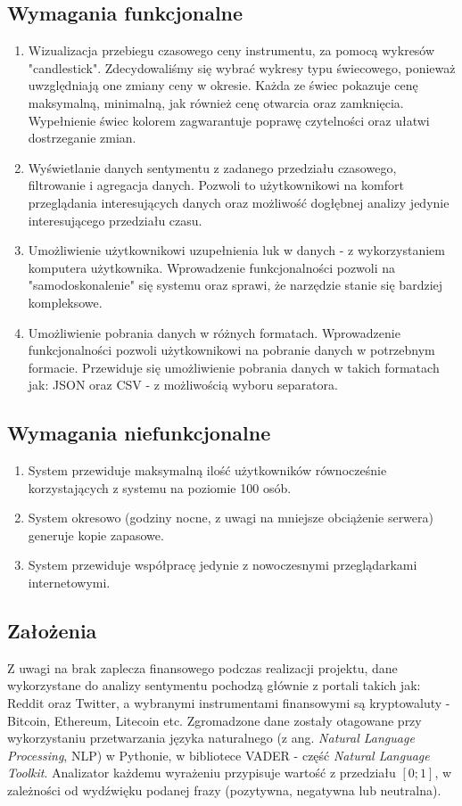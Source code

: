 \subsection{Wymagania funkcjonalne}
\begin{enumerate}
  \item {Wizualizacja przebiegu czasowego ceny instrumentu, za pomocą wykresów "candlestick". Zdecydowaliśmy się wybrać wykresy typu świecowego, ponieważ uwzględniają one zmiany ceny w okresie. Każda ze świec pokazuje cenę maksymalną, minimalną, jak również cenę otwarcia oraz zamknięcia. Wypełnienie świec kolorem zagwarantuje poprawę czytelności oraz ułatwi dostrzeganie zmian.}
  \item {Wyświetlanie danych sentymentu z zadanego przedziału czasowego, filtrowanie i agregacja danych. Pozwoli to użytkownikowi na komfort przeglądania interesujących danych oraz możliwość dogłębnej analizy jedynie interesującego przedziału czasu.}
  \item {Umożliwienie użytkownikowi uzupełnienia luk w danych - z wykorzystaniem komputera użytkownika. Wprowadzenie funkcjonalności pozwoli na "samodoskonalenie" się systemu oraz sprawi, że narzędzie stanie się bardziej kompleksowe.}
  \item {Umożliwienie pobrania danych w różnych formatach. Wprowadzenie funkcjonalności pozwoli użytkownikowi na pobranie danych w potrzebnym formacie. Przewiduje się umożliwienie pobrania danych w takich formatach jak: JSON oraz CSV - z możliwością wyboru separatora.}
\end{enumerate}
  \clearpage
\subsection{Wymagania niefunkcjonalne}
\begin{enumerate}
  \item {System przewiduje maksymalną ilość użytkowników równocześnie korzystających z systemu na poziomie 100 osób.}
  \item {System okresowo (godziny nocne, z uwagi na mniejsze obciążenie serwera) generuje kopie zapasowe.}
  \item {System przewiduje współpracę jedynie z nowoczesnymi przeglądarkami internetowymi.}
\end{enumerate}
\subsection{Założenia}
Z uwagi na brak zaplecza finansowego podczas realizacji projektu, dane wykorzystane do analizy sentymentu pochodzą głównie z portali takich jak: Reddit oraz Twitter, a wybranymi instrumentami finansowymi są kryptowaluty - Bitcoin, Ethereum, Litecoin etc. Zgromadzone dane zostały otagowane przy wykorzystaniu przetwarzania języka naturalnego (z ang. \textit{Natural Language Processing}, NLP) w Pythonie, w bibliotece VADER - część \textit{Natural Language Toolkit}. Analizator każdemu wyrażeniu przypisuje wartość z przedziału $[0; 1]$, w zależności od wydźwięku podanej frazy (pozytywna, negatywna lub neutralna).
\newpage
